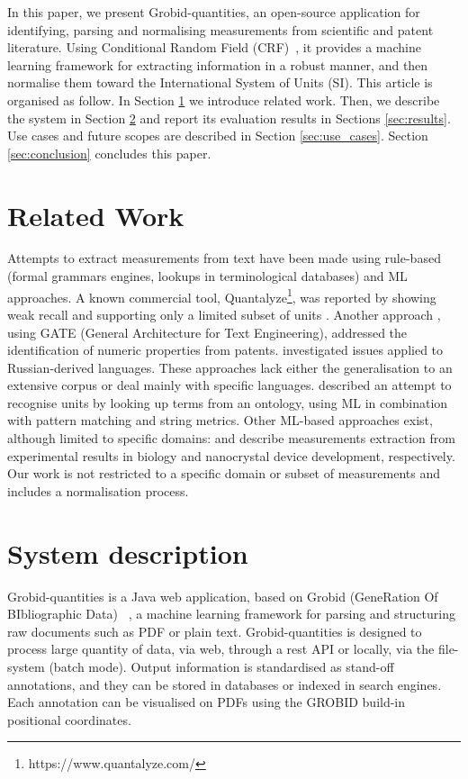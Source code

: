 \documentclass[sigconf]{acmart}
\begin{document}
In this paper, we present Grobid-quantities, an open-source application for identifying, parsing and normalising measurements from scientific and patent literature. Using Conditional Random Field (CRF)~\cite{lafferty2001conditional}, it provides a machine learning framework for extracting information in a robust manner, and then normalise them toward the International System of Units (SI). 
This article is organised as follow. In Section \ref{sec:related_work} we introduce related work. Then, we describe the system in Section \ref{sec:system} and report its evaluation results in Sections \ref{sec:results}. Use cases and future scopes are described in Section \ref{sec:use_cases}. Section \ref{sec:conclusion} concludes this paper.

\section{Related Work}
\label{sec:related_work}
Attempts to extract measurements from text have been made using rule-based (formal grammars engines, lookups in terminological databases) and ML approaches. A known commercial tool, Quantalyze\footnote{https://www.quantalyze.com/}, was reported by \cite{hundman2017measurement} showing weak recall and supporting only a limited subset of units \cite{aras2014applications}. Another approach \cite{agatonovic2008large}, using GATE (General Architecture for Text Engineering), addressed the identification of numeric properties from patents. \cite{am2013processing} investigated issues applied to Russian-derived languages. These approaches lack either the generalisation to an extensive corpus or deal mainly with specific languages. \cite{berrahou2013extract} described an attempt to recognise units by looking up terms from an ontology, using ML in combination with pattern matching and string metrics. Other ML-based approaches exist, although limited to specific domains: \cite{kang_extracting_2013} and \cite{dieb2015framework} describe measurements extraction from experimental results in biology and nanocrystal device development, respectively. Our work is not restricted to a specific domain or subset of measurements and includes a normalisation process. 

\section{System description}
\label{sec:system}
Grobid-quantities is a Java web application, based on Grobid (GeneRation Of BIbliographic Data)~\cite{GROBID} \cite{lopez2009grobid}, a machine learning framework for parsing and structuring raw documents such as PDF or plain text. 
Grobid-quantities is designed to process large quantity of data, via web, through a rest API or locally, via the file-system (batch mode). 
Output information is standardised as stand-off annotations, and they can be stored in databases or indexed in search engines. Each annotation can be visualised on PDFs using the GROBID build-in positional coordinates.
\end{document}

